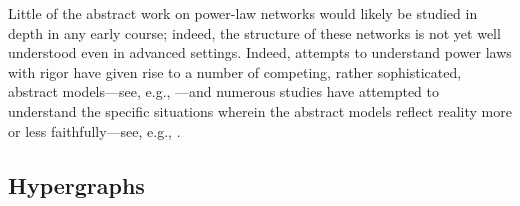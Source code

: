\bigskip

\noindent {}
\bigskip

Little of the abstract work on power-law networks would likely be studied in depth in any early course; indeed, the structure of these networks is not yet well understood even in advanced settings.  Indeed, attempts to understand power laws with rigor have given rise to a number of competing, rather sophisticated, abstract models---see, e.g., \cite{AielloCL00,BarabasiA99,Bollobas85,ChenCGJSW}---and numerous studies have attempted to understand the specific situations wherein the abstract models reflect reality more or less faithfully---see, e.g.,
\cite{BuT02,FaloutsosFF99,JaiswalRT04,TangmunarunkitGJSW02,ZeguraCD97}.


\subsection{Hypergraphs}
\label{sec:hypergraphs}

